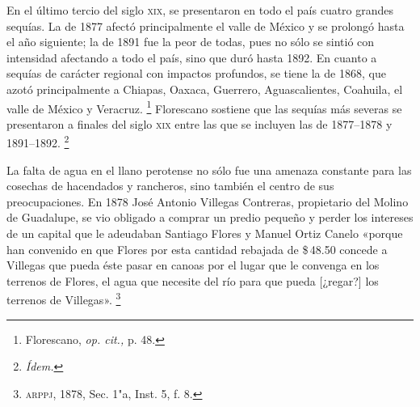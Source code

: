 \documentclass[14pt,twoside,final]{extbook} %
\let\oldfootnote\footnote
\renewcommand\footnote[1]{%
\oldfootnote{\hspace{1mm}#1}}
\begin{document}
En el último tercio del siglo \textsc{xix}, se presentaron en todo el país cuatro grandes sequías. La de 1877 afectó principalmente el valle de México y se prolongó hasta el año siguiente; la de 1891 fue la peor de todas, pues no sólo se sintió con intensidad afectando a todo el país, sino que duró hasta 1892. En cuanto a sequías de carácter regional con impactos profundos, se tiene la de 1868, que azotó principalmente a Chiapas, Oaxaca, Guerrero, Aguascalientes, Coahuila, el valle de México y Veracruz.\footnote{Florescano, \emph{op. cit.,} p. 48.} Florescano sostiene que las sequías más severas se presentaron a finales del siglo \textsc{xix} entre las que se incluyen las de 1877--1878 y 1891--1892.\footnote{\em Ídem.} \pagebreak[4]

La falta de agua en el llano perotense no sólo fue una amenaza constante para las cosechas de hacendados y rancheros, sino también el centro de sus preocupaciones. En 1878 José Antonio Villegas Contreras, propietario del Molino de Guadalupe, se vio obligado a comprar un predio pequeño y perder los intereses de un capital que le adeudaban Santiago Flores y Manuel Ortiz Canelo «porque han convenido en que Flores por esta cantidad rebajada de \$\,48.50 concede a Villegas que pueda éste pasar en canoas por el lugar que le convenga en los terrenos de Flores, el agua que necesite del río para que pueda [¿regar?] los terrenos de Villegas».\footnote{\textsc{arppj}, 1878, Sec. 1"a, Inst. 5, f. 8.}
\end{document}
